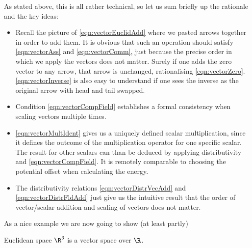 \begin{nte}
	As stated above, this is all rather technical, so let us sum briefly up the rationale and the key ideas:
	\begin{itemize}
		\item Recall the picture of \eqref{eqn:vectorEuclidAdd} where we pasted arrows together in order to add them. 
			It is obvious that such an operation should satisfy \eqref{eqn:vectorAss} and \eqref{eqn:vectorComm}, just because the precise order in which we apply the vectors does not matter.
			Surely if one adds the zero vector to any arrow, that arrow is unchanged, rationalising \eqref{eqn:vectorZero}.
			\eqref{eqn:vectorInverse} is also easy to understand if one sees the inverse as the original arrow with head and tail swapped.
		\item Condition \eqref{eqn:vectorCompField} establishes a formal consistency when scaling vectors multiple times.
		\item \eqref{eqn:vectorMultIdent} gives us a uniquely defined scalar multiplication, since it defines the outcome of the multiplication operator for one specific scalar.
			The result for other scalars can than be deduced by applying distributivity and \eqref{eqn:vectorCompField}. 
			It is remotely comparable to choosing the potential offset when calculating the energy.
		\item The distributivity relations \eqref{eqn:vectorDistrVecAdd} and \eqref{eqn:vectorDistrFldAdd} just give us the intuitive result that the order of vector/scalar addition and scaling of vectors does not matter.
	\end{itemize}
\end{nte}

\noindent
As a nice example we are now going to show (at least partly)
\begin{prop}
	Euclidean space $\R^3$ is a vector space over $\R$.
\end{prop}

